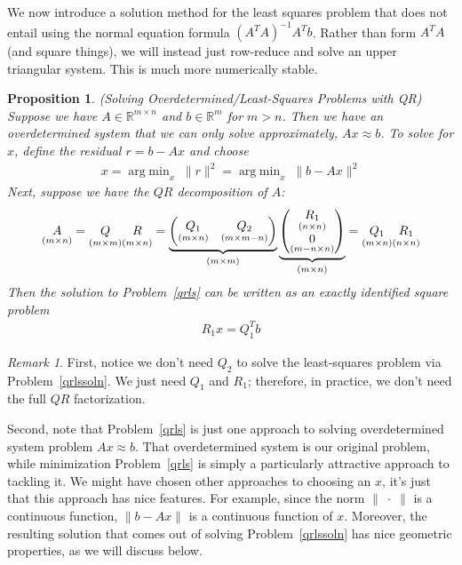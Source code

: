 \documentclass[12pt]{article}
\numberwithin{equation}{section} %
\theoremstyle{plain}
\newtheorem{prop}[thm]{Proposition}
\theoremstyle{definition}
\theoremstyle{remark}
\newtheorem*{rmk}{Remark}
\newcommand{\Rm}{\mathbb{R}^m}
\newcommand{\Rmn}{\mathbb{R}^{m\times n}}
\DeclareMathOperator*{\argmin}{arg\;min}
\begin{document}
We now introduce a solution method for the least squares problem that
does not entail using the normal equation formula $(A^TA)^{-1}A^Tb$.
Rather than form $A^TA$ (and square things), we will instead just
row-reduce and solve an upper triangular system. This is much more
numerically stable.

\clearpage
\begin{prop}
\emph{(Solving Overdetermined/Least-Squares Problems with QR)}
Suppose we have $A\in\Rmn$ and $b\in\Rm$ for $m>n$.
Then we have an overdetermined system that we can only solve
approximately, $Ax\approx b$. To solve for $x$,
define the residual $r=b-Ax$ and choose
\begin{align}
  x = \argmin_x \;\lVert r\rVert^2 =
  \argmin_x \;\lVert b-Ax\rVert^2
  \label{qrls}
\end{align}
Next, suppose we have the $QR$ decomposition of $A$:
\begin{align*}
  \underset{(m\times n)}{A}
  =
  \underset{(m\times m)}{Q}
  \underset{(m\times n)}{R\vphantom{Q}}
  =
  \underbrace{%
    \begin{pmatrix}
      \underset{(m\times n)}{Q_1}
      & \underset{(m\times m-n)}{Q_2}
    \end{pmatrix}
  }_{(m\times m)}
  \underbrace{%
    \begin{pmatrix}
      \underset{(n\times n)}{R_1}
      \\
      \underset{(m-n\times n)}{0}
    \end{pmatrix}
  }_{(m\times n)}
  =
  \underset{(m\times n)}{Q_1}
  \underset{(n\times n)}{R_1\vphantom{Q_1}}
\end{align*}
Then the solution to Problem~\ref{qrls} can be written as an exactly
identified square problem
\begin{align}
  R_1 x = Q_1^T b
  \label{qrlssoln}
\end{align}
\end{prop}
\begin{rmk}
First, notice we don't need $Q_2$ to solve the least-squares problem via
Problem~\ref{qrlssoln}. We just need $Q_1$ and $R_1$; therefore, in
practice, we don't need the full $QR$ factorization.

Second, note that Problem~\ref{qrls} is just one approach to solving
overdetermined system problem $Ax\approx b$. That overdetermined system
is our original problem, while minimization Problem~\ref{qrls} is simply
a particularly attractive approach to tackling it. We might have chosen
other approaches to choosing an $x$, it's just that this approach has
nice features. For example, since the norm $\lVert\;\cdot\;\rVert$ is a
continuous function, $\lVert b-Ax\lVert$ is a continuous function of
$x$. Moreover, the resulting solution that comes out of solving
Problem~\ref{qrlssoln} has nice geometric properties, as we will discuss
below.
\end{rmk}
\end{document}
